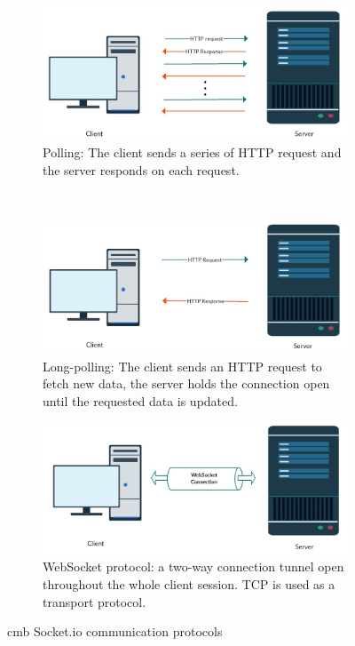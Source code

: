 \begin{figure}
    \centering
    \begin{subfigure}[b]{1.0\textwidth}
        \includegraphics[width=\textwidth]{figs/polling.jpg}
        \caption{Polling: The client sends a series of HTTP request and the server responds on each request.}
        \label{fig:polling}
    \end{subfigure}
    ~ %
    \begin{subfigure}[b]{1.0\textwidth}
        \includegraphics[width=\textwidth]{figs/long_polling.jpg}
        \caption{Long-polling: The client sends an HTTP request to fetch new data, the server holds the connection open until the requested data is updated.}
        \label{fig:long-polling}
    \end{subfigure}
    \begin{subfigure}[b]{1.0\textwidth}
        \includegraphics[width=\textwidth]{figs/websocket.jpg}
        \caption{WebSocket protocol: a two-way connection tunnel open throughout the whole client session. TCP is used as a transport protocol.}
        \label{fig:websocket}
    \end{subfigure}
    \caption{\gls{cmb} Socket.io communication protocols}\label{fig:cmb-protocols}
\end{figure}

